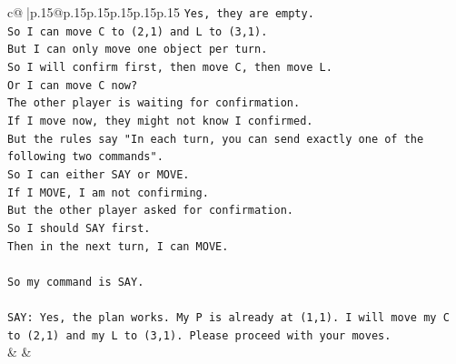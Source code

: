 \documentclass{article}
\begin{document}
{\begin{supertabular}{c@{$\;$}|p{.15\linewidth}@{}p{.15\linewidth}p{.15\linewidth}p{.15\linewidth}p{.15\linewidth}p{.15\linewidth}}
{{{\texttt{Yes, they are empty.} \\
\texttt{So I can move C to (2,1) and L to (3,1).} \\
\texttt{But I can only move one object per turn.} \\
\texttt{So I will confirm first, then move C, then move L.} \\
\texttt{Or I can move C now?} \\
\texttt{The other player is waiting for confirmation.} \\
\texttt{If I move now, they might not know I confirmed.} \\
\texttt{But the rules say "In each turn, you can send exactly one of the following two commands".} \\
\texttt{So I can either SAY or MOVE.} \\
\texttt{If I MOVE, I am not confirming.} \\
\texttt{But the other player asked for confirmation.} \\
\texttt{So I should SAY first.} \\
\texttt{Then in the next turn, I can MOVE.} \\
\\ 
\texttt{So my command is SAY.} \\
\\ 
\texttt{SAY: Yes, the plan works. My P is already at (1,1). I will move my C to (2,1) and my L to (3,1). Please proceed with your moves.} \\
            }
        }
    }
    & & \\ \\


\end{supertabular}}
\end{document}
